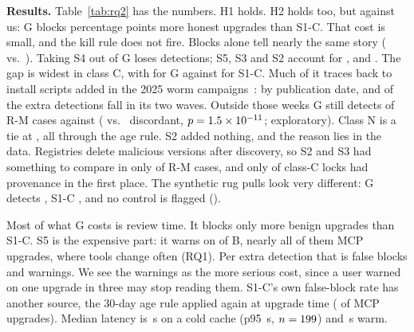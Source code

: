 \documentclass[conference]{IEEEtran}
\newcommand{\G}{\textsf{G}}
\newcommand{\SC}{\textsf{S1-C}}
\begin{document}
\textbf{Results.} Table~\ref{tab:rq2} has the numbers. H1 holds. H2 holds too, but against us: \G{} blocks
\FbDiffPP{} percentage points more honest upgrades than \SC. That cost is small, and the kill rule does not fire. Blocks
alone tell nearly the same story (\DetGBlockP{} vs.\ \DetSCBlockP). Taking S4 out of \G{} loses \AblFour{}
detections; S5, S3 and S2 account for \AblFive, \AblThree{} and \AblTwo. The gap is widest in class C, with \RMCGP{}
\RMCGCI{} for \G{} against \RMCSCP{} for \SC. Much of it traces back to install scripts added in the 2025 worm
campaigns~\cite{cisa2025shaihulud,checkpoint2025shaihulud}: by publication date, \WaveOneOnly{} and \WaveTwoOnly{} of
the \AddedDet{} extra detections fall in its two waves. Outside those weeks \G{} still detects \OutGP{} of \OutN{} R-M cases against \OutSCP{}
(\OutOnly{} vs.\ \OutSCOnly{} discordant, $p = 1.5\times10^{-11}$; exploratory). Class N is a tie at \RMNGP, all through the age
rule. S2 added nothing, and the reason lies in the data. Registries delete malicious versions after discovery, so S2
and S3 had something to compare in only \EvalSTwo{} of \NRM{} R-M cases, and only \STwoRMCP{} of class-C locks had
provenance in the first place. The synthetic rug pulls look very different: \G{} detects \RSG, \SC{} \RSSC, and no
control is flagged (\RSCtrl).

Most of what \G{} costs is review time. It blocks only \FbExtra{} more benign upgrades than \SC. S5 is the
expensive part: it warns on \WarnGP{} of B, nearly all of them MCP upgrades, where tools change often (RQ1). Per extra
detection that is \FbPerDet{} false blocks and \WarnPerDet{} warnings. We see the warnings as the more serious cost,
since a user warned on one upgrade in three may stop reading them. \SC's own \FbSCP{} false-block rate has another
source, the 30-day age rule applied again at upgrade time (\FbSCMcpP{} of MCP upgrades). Median latency is
\LatColdMed{}\,s on a cold cache (p95 \LatColdPNF{}\,s, $n = 199$) and \LatWarmMed{}\,s warm.
\end{document}
